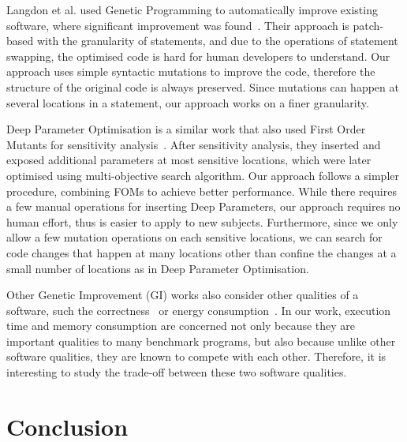 \documentclass[oribibl]{llncs}
\begin{document}
Langdon et al. used Genetic Programming to automatically improve existing software, where significant improvement was found~\cite{6733370,Langdon:2014:IMI:2576768.2598244}.
Their approach is patch-based with the granularity of statements, and due to the operations of statement swapping, the optimised code is hard for human developers to understand.
Our approach uses simple syntactic mutations to improve the code, therefore the structure of the original code is always preserved.
Since mutations can happen at several locations in a statement, our approach works on a finer granularity.

Deep Parameter Optimisation is a similar work that also used First Order Mutants for sensitivity analysis~\cite{Wu:2015:DPO:2739480.2754648}.
After sensitivity analysis, they inserted and exposed additional parameters at most sensitive locations, which were later optimised using multi-objective search algorithm.
Our approach follows a simpler procedure, combining FOMs to achieve better performance.
While there requires a few manual operations for inserting Deep Parameters, our approach requires no human effort, thus is easier to apply to new subjects.
Furthermore, since we only allow a few mutation operations on each sensitive locations, we can search for code changes that happen at many locations other than confine the changes at a small number of locations as in Deep Parameter Optimisation.

Other Genetic Improvement (GI) works also consider other qualities of a software, such the correctness~\cite{6035728} or energy consumption~\cite{Bruce:2015:REC:2739480.2754752}.
In our work, execution time and memory consumption are concerned not only because they are important qualities to many benchmark programs, but also because unlike other software qualities, they are known to compete with each other.
Therefore, it is interesting to study the trade-off between these two software qualities.

\section{Conclusion}
\label{sec_conclusion}


   
\end{document}
